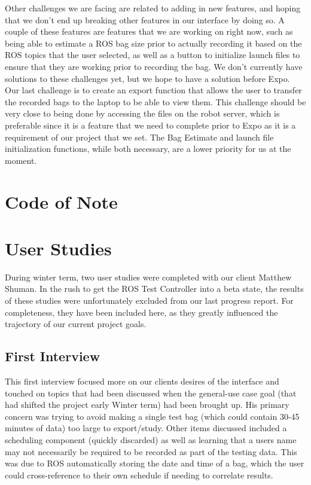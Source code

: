 \documentclass[onecolumn, draftclsnofoot,10pt, compsoc]{IEEEtran}
\begin{document}
Other challenges we are facing are related to adding in new features, and hoping that we don't end up breaking other features in our interface by doing so. A couple of these features are features that we are working on right now, such as being able to estimate a ROS bag size prior to actually recording it based on the ROS topics that the user selected, as well as a button to initialize launch files to ensure that they are working prior to recording the bag. We don't currently have solutions to these challenges yet, but we hope to have a solution before Expo. Our last challenge is to create an export function that allows the user to transfer the recorded bags to the laptop to be able to view them. This challenge should be very close to being done by accessing the files on the robot server, which is preferable since it is a feature that we need to complete prior to Expo as it is a requirement of our project that we set. The Bag Estimate and launch file initialization functions, while both necessary, are a lower priority for us at the moment.

\section{Code of Note}

\section{User Studies}
During winter term, two user studies were completed with our client Matthew Shuman. In the rush to get the ROS Test Controller into a beta state, the results of these studies were unfortunately excluded from our last progress report. For completeness, they have been included here, as they greatly influenced the trajectory of our current project goals. 

\subsection{First Interview}
This first interview focused more on our clients desires of the interface and touched on topics that had been discussed when the general-use case goal (that had shifted the project early Winter term) had been brought up. His primary concern was trying to avoid making a single test bag (which could contain 30-45 minutes of data) too large to export/study. Other items discussed included a scheduling component (quickly discarded) as well as learning that a users name may not necessarily be required to be recorded as part of the testing data. This was due to ROS automatically storing the date and time of a bag, which the user could cross-reference to their own schedule if needing to correlate results.
\end{document}
